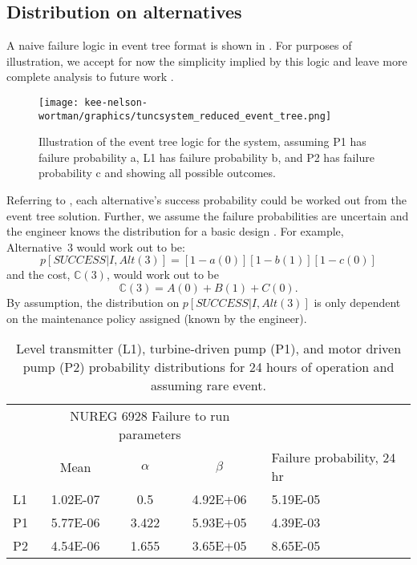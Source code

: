 \documentclass[review]{elsarticle}
\begin{document}
	\subsection{Distribution on alternatives}\label{sec:distribution_on_alternatives}
		A naive failure logic in event tree format is shown in .
		For purposes of illustration, we accept for now the simplicity implied by this logic and leave more
		complete analysis to future work \citep[see][for example]{zkrkm2013,t2013}.
	
		\begin{figure}[ht!]
		\centering
		\texttt{[image: kee-nelson-wortman/graphics/tuncsystem\_reduced\_event\_tree.png]}
		\caption{Illustration of the event tree logic for the system, assuming P1 has failure probability a,
		L1 has failure probability b, and P2 has failure probability c and showing all possible outcomes.}
		\label{fig:tuncsystem_reduced_event_tree}
		\end{figure}

		Referring to , each alternative's success probability 
		could be worked out from the event tree solution. 
		Further, we assume the failure probabilities are uncertain and the engineer knows
		the distribution for a basic design \citep[][for example]{ewgra2007}.
		For example, Alternative~3 would work out to be:
		\begin{equation}\label{eq:event_tree_solution}
		p[SUCCESS|I,Alt(3)] = [1-a(0)][1-b(1)][1-c(0)] \nonumber
		\end{equation}		
		\noindent and the cost, $\mathbb{C}(3)$, would work out to be	
		\begin{equation}
		\mathbb{C}(3) = A(0) + B(1) + C(0). \nonumber
		\end{equation}
		\noindent By assumption, the distribution on $p[SUCCESS|I,Alt(3)]$ is only
		dependent on the maintenance policy assigned (known by the engineer).		

		\begin{table}[ht]
		\caption{Level transmitter (L1), turbine-driven pump (P1), and motor driven pump (P2) probability distributions
		for 24 hours of operation and assuming rare event.}
		\centering
		\begin{tabular}{l c c c l}
			& \multicolumn{3}{c}{NUREG 6928 Failure to run parameters} &				\\
			& Mean		& $\alpha$ 	& $\beta$ 		& Failure probability, 24 hr		\\
		L1	& 1.02E-07	& 0.5			& 4.92E+06	&  5.19E-05 				\\
		P1	& 5.77E-06	& 3.422		& 5.93E+05	&  4.39E-03 				\\
		P2	& 4.54E-06	& 1.655		& 3.65E+05	&  8.65E-05				\\
		\end{tabular}
		\label{tab:failure_parameters}
		\end{table}%
\end{document}
